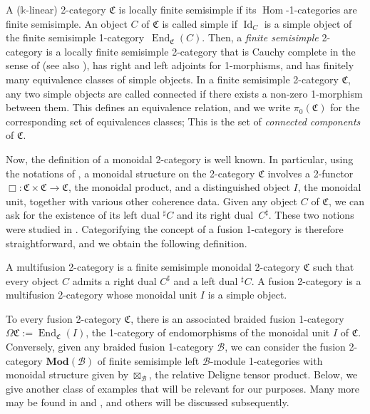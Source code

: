\documentclass[11pt]{article}
\numberwithin{equation}{section}
\numberwithin{equation}{section}
\begin{document}
A ($\mathds{k}$-linear) 2-category $\mathfrak{C}$ is locally finite semisimple if its $\operatorname{Hom}$-1-categories are finite semisimple. An object $C$ of $\mathfrak{C}$ is called simple if $\operatorname{Id}_C$ is a simple object of the finite semisimple 1-category~$\operatorname{End}_{\mathfrak{C}}(C)$. Then, a \textit{finite semisimple} 2-category is a locally finite semisimple 2-category that is Cauchy complete in the sense of \cite{GJF} (see also \cite{D1}), has right and left adjoints for 1-morphisms, and has finitely many equivalence classes of simple objects. In a finite semisimple 2-category $\mathfrak{C}$, any two simple objects are called connected if there exists a non-zero 1-morphism between them. This defines an equivalence relation, and we write $\pi_0(\mathfrak{C})$ for the corresponding set of equivalences classes; This is the set of \textit{connected components} of $\mathfrak{C}$.

Now, the definition of a monoidal 2-category is well known. In particular, using the notations of \cite{SP}, a monoidal structure on the 2-category $\mathfrak{C}$ involves a 2-functor $\Box\colon \mathfrak{C}\times \mathfrak{C}\rightarrow\mathfrak{C}$, the monoidal product, and a distinguished object $I$, the monoidal unit, together with various other coherence data. Given any object $C$ of $\mathfrak{C}$, we can ask for the existence of its left dual $^{\sharp}C$ and its right dual~$C^{\sharp}$. These two notions were studied in \cite{Pstr}. Categorifying the concept of a fusion 1-category is therefore straightforward, and we obtain the following definition.

\begin{Definition}
A multifusion 2-category is a finite semisimple monoidal 2-category $\mathfrak{C}$ such that every object $C$ admits a right dual $C^{\sharp}$ and a left dual $^{\sharp}C$. A fusion 2-category is a multifusion 2-category whose monoidal unit $I$ is a simple object.
\end{Definition}

To every fusion 2-category $\mathfrak{C}$, there is an associated braided fusion 1-category $\Omega\mathfrak{C}:=\operatorname{End}_{\mathfrak{C}}(I)$, the 1-category of endomorphisms of the monoidal unit $I$ of $\mathfrak{C}$. Conversely, given any braided fusion 1-category $\mathcal{B}$, we can consider the fusion 2-category $\mathbf{Mod}(\mathcal{B})$ of finite semisimple left $\mathcal{B}$-module 1-categories with monoidal structure given by $\boxtimes_{\mathcal{B}}$, the relative Deligne tensor product. Below, we give another class of examples that will be relevant for our purposes. Many more may be found in \cite{DR} and \cite{DY23}, and others will be discussed subsequently.
\end{document}
